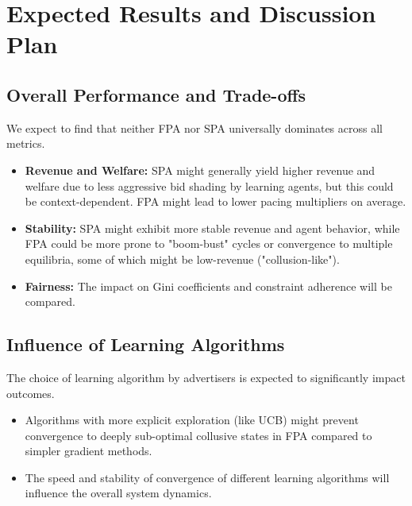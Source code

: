 \documentclass[12pt, a4paper]{article}
\begin{document}
\section{Expected Results and Discussion Plan}
\subsection{Overall Performance and Trade-offs}
We expect to find that neither FPA nor SPA universally dominates across all metrics.
\begin{itemize}
    \item \textbf{Revenue and Welfare:} SPA might generally yield higher revenue and welfare due to less aggressive bid shading by learning agents, but this could be context-dependent. FPA might lead to lower pacing multipliers on average.
    \item \textbf{Stability:} SPA might exhibit more stable revenue and agent behavior, while FPA could be more prone to "boom-bust" cycles or convergence to multiple equilibria, some of which might be low-revenue ("collusion-like").
    \item \textbf{Fairness:} The impact on Gini coefficients and constraint adherence will be compared.
\end{itemize}

\subsection{Influence of Learning Algorithms}
The choice of learning algorithm by advertisers is expected to significantly impact outcomes.
\begin{itemize}
    \item Algorithms with more explicit exploration (like UCB) might prevent convergence to deeply sub-optimal collusive states in FPA compared to simpler gradient methods.
    \item The speed and stability of convergence of different learning algorithms will influence the overall system dynamics.
\end{itemize}
\end{document}
